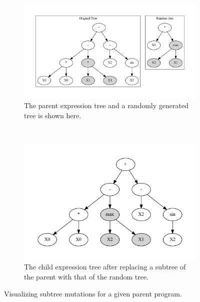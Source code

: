 \begin{figure}[htp]
  \centering
  \begin{subfigure}{\textwidth}
    \begin{adjustbox}{width=\columnwidth,center}
      \includegraphics{images/graphviz/subtree_before.dot.pdf}
    \end{adjustbox}
    \caption{The parent expression tree and a randomly generated tree is shown here.}
    \label{fig:subtree_muta}
  \end{subfigure}%
  \\
  \begin{subfigure}{\textwidth}
    \centering
    \includegraphics[scale=0.75]{images/graphviz/subtree_after.dot.pdf}
    \caption{The child expression tree after replacing a subtree of the parent with that of the random tree.}
    \label{fig:subtree_mutb}
  \end{subfigure}
  \caption{Visualizing subtree mutations for a given parent program.}
  \label{fig:subtree}
\end{figure}
  
